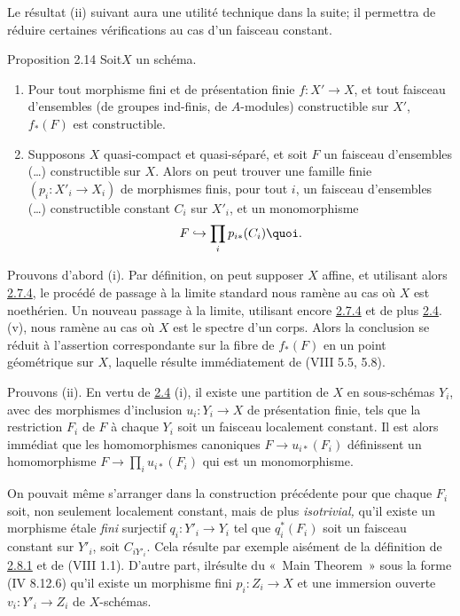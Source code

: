 \documentclass[10pt]{../fichiers-configuration-latex/smfart}
\begin{document}
Le résultat (ii) suivant aura une utilité technique dans la suite; il
permettra de réduire certaines vérifications au cas d'un faisceau
constant.

\begin{enonce*}{Proposition 2.14}
Soit\pageoriginale $X$ un schéma.
\begin{enumerate}
\renewcommand{\theenumi}{\roman{enumi}}
\renewcommand{\labelenumi}{(\theenumi)}
\item Pour tout morphisme fini et de présentation finie
$f:X'\rightarrow X$, et tout faisceau d'ensembles (\resp de groupes
ind-finis, \resp de $A$-modules) constructible sur $X'$, $f_{\ast}(F)$
est constructible.

\item Supposons $X$ quasi-compact et quasi-séparé, et soit $F$ un
faisceau d'ensembles (\resp\ldots) constructible sur $X$. Alors on
peut trouver une famille finie $(p_i:X'_i\rightarrow X_i)$ de
morphismes finis, pour tout $i$, un faisceau d'ensembles (\resp\ldots)
constructible constant $C_i$ sur $X'_i$, et un monomorphisme
$$
F\hookrightarrow \prod_i p_{i\ast}(C_i){\quoi}.
$$
\end{enumerate}
\end{enonce*}

Prouvons d'abord (i). Par définition, on peut supposer $X$ affine, et
utilisant alors \hyperref[IX.cor2.7.4]{2.7.4}, le procédé de passage à la limite standard nous
ramène au cas où $X$ est noethérien. Un nouveau passage à la limite,
utilisant encore \hyperref[IX.cor2.7.4]{2.7.4} et de plus \hyperref[IX.prop2.4]{2.4}. (v), nous ramène au cas où $X$ est le spectre d'un corps. Alors la conclusion se réduit à l'assertion
correspondante sur la fibre de $f_{\ast}(F)$ en un point géométrique
sur $X$, laquelle résulte immédiatement de (VIII 5.5, 5.8).

Prouvons (ii). En vertu de \hyperref[IX.prop2.4]{2.4} (i), il existe une partition de $X$ en
sous-schémas $Y_i$, avec des morphismes d'inclusion
$u_i:Y_i\rightarrow X$ de présentation finie, tels que la restriction
$F_i$ de $F$ à chaque $Y_i$ soit un faisceau localement constant. Il
est alors immédiat que les homomorphismes canoniques $F\rightarrow
u_{i\ast}(F_i)$ définissent un homomorphisme $F\rightarrow \prod_i
u_{i\ast}(F_i)$ qui est un monomorphisme.

On pouvait même s'arranger dans la construction précédente pour que
chaque $F_i$ soit, non seulement localement constant, mais de plus
\emph{isotrivial,} \ie qu'il existe un morphisme étale \emph{fini}
surjectif $q_i:Y'_i\rightarrow Y_i$ tel que $q^{\ast}_i(F_i)$ soit un
faisceau constant sur $Y'_i$, soit $C_{iY'_i}$. Cela résulte par
exemple aisément de la définition de \hyperref[IX.lem2.8.1]{2.8.1} et de (VIII 1.1). D'autre
part, il\pageoriginale résulte du « Main Theorem »  sous la forme
(\EGA IV 8.12.6) qu'il existe un morphisme fini $p_i:Z_i\rightarrow X$
et une immersion ouverte $v_i:Y'_i\rightarrow Z_i$ de $X$-schémas.
\end{document}
